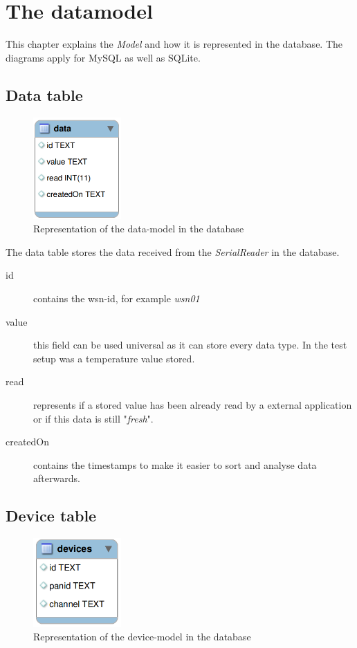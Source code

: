 \newpage
\section{The datamodel}
This chapter explains the \textit{Model} and how it is represented in the database. The diagrams apply for MySQL as well as SQLite.

\subsection{Data table}
\begin{figure}[H]
	\centering
	\includegraphics[width=0.3\textwidth]{pic/DatamodelData.png}%
    \caption{Representation of the data-model in the database}
    \label{DatamodelDatapic}%
\end{figure}

The data table stores the data received from the \textit{SerialReader} in the database.

\begin{description}
	\item[id] contains the wsn-id, for example \textit{wsn01}
	\item[value] this field can be used universal as it can store every data type. In the test setup was a temperature value stored.
	\item[read] represents if a stored value has been already read by a external application or if this data is still "\textit{fresh}".
	\item[createdOn] contains the timestamps to make it easier to sort and analyse data afterwards.
\end{description}

\newpage
\subsection{Device table}
\begin{figure}[H]
	\centering
	\includegraphics[width=0.3\textwidth]{pic/DatamodelDevices.png}%
    \caption{Representation of the device-model in the database}
    \label{DatamodelDevicespic}%
\end{figure}

